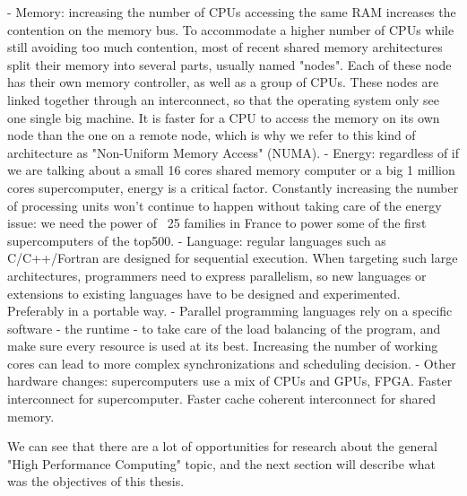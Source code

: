  - Memory: increasing the number of CPUs accessing the same RAM increases the contention on the memory bus. To accommodate a higher number of CPUs while still avoiding too much contention, most of recent shared memory architectures split their memory into several parts, usually named "nodes". Each of these node has their own memory controller, as well as a group of CPUs. These nodes are linked together through an interconnect, so that the operating system only see one single big machine.
 It is faster for a CPU to access the memory on its own node than the one on a remote node, which is why we refer to this kind of architecture as "Non-Uniform Memory Access" (NUMA).
 - Energy: regardless of if we are talking about a small 16 cores shared memory computer or a big 1 million cores supercomputer, energy is a critical factor. Constantly increasing the number of processing units won't continue to happen without taking care of the energy issue: we need the power of ~25 families in France to power some of the first supercomputers of the top500.
 - Language: regular languages such as C/C++/Fortran are designed for sequential execution. When targeting such large architectures, programmers need to express parallelism, so new languages or extensions to existing languages have to be designed and experimented. Preferably in a portable way.
 - Parallel programming languages rely on a specific software - the runtime - to take care of the load balancing of the program, and make sure every resource is used at its best. Increasing the number of working cores can lead to more complex synchronizations and scheduling decision.
 - Other hardware changes: supercomputers use a mix of CPUs and GPUs, FPGA. Faster interconnect for supercomputer. Faster cache coherent interconnect for shared memory.



We can see that there are a lot of opportunities for research about the general "High Performance Computing" topic, and the next section will describe what was the objectives of this thesis.




